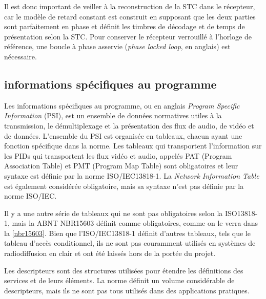 \documentclass[12pt,a4paper]{article}
\begin{document}
Il est donc important de veiller à la reconstruction de la STC dans le récepteur, car le modèle de retard constant est construit en supposant que les deux parties sont parfaitement en phase et définit les timbres de décodage et de temps de présentation selon la STC. Pour conserver le récepteur verrouillé à l'horloge de référence, une boucle à phase asservie (\textit{phase locked loop}, en anglais) est nécessaire.

\subsection{informations spécifiques au programme}
\label{iso_psi}

Les informations spécifiques au programme, ou en anglais \textit{Program Specific Information} (PSI), est un ensemble de données normatives utiles à la transmission, le démultiplexage et la présentation des flux de audio, de vidéo et de données. L'ensemble du PSI est organisée en tableaux, chacun ayant une fonction spécifique dans la norme. Les tableaux qui transportent l'information sur les PIDs qui transportent les flux vidéo et audio, appelés PAT (Program Association Table) et PMT (Program Map Table) sont obligatoires et leur syntaxe est définie par la norme ISO/IEC13818-1. La \textit{Network Information Table} est également considérée obligatoire, mais sa syntaxe n'est pas définie par la norme ISO/IEC.

Il y a une autre série de tableaux qui ne sont pas obligatoires selon la ISO13818-1, mais la ABNT NBR15603 définit comme obligatoires, comme on le verra dans la \autoref{nbr15603}. Bien que l'ISO/IEC13818-1 définit d'autres tableaux, tels que le tableau d'accès conditionnel, ils ne sont pas couramment utilisés en systèmes de radiodiffusion en clair et ont été laissés hors de la portée du projet.

Les descripteurs sont des structures utilisées pour étendre les définitions des services et de leurs éléments. La norme définit un volume considérable de descripteurs, mais ils ne sont pas tous utilisés dans des applications pratiques.

\end{document}
